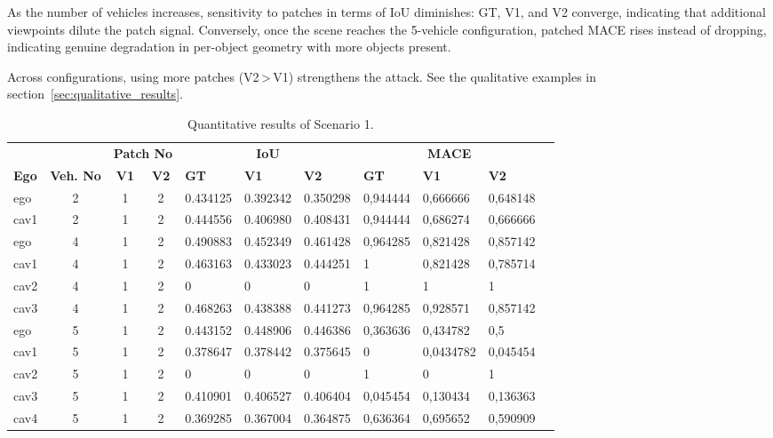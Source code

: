 As the number of vehicles increases, sensitivity to patches in terms of IoU diminishes: GT, V1, and V2 converge, indicating that additional viewpoints dilute the patch signal.
Conversely, once the scene reaches the 5-vehicle configuration, patched MACE rises instead of dropping, indicating genuine degradation in per-object geometry with more objects present.

Across configurations, using more patches (V2\,>\,V1) strengthens the attack.
See the qualitative examples in section~\ref{sec:qualitative_results}.

\begin{table}[h]
    \caption{Quantitative results of Scenario 1.}
    \label{tab:scenario1_results}
    \begin{tabularx}{\textwidth}{l c c c *{7}{X}}
        \toprule
            &             &   \multicolumn{2}{c}{\textbf{Patch No}}  & \multicolumn{3}{c}{\textbf{IoU}} & \multicolumn{3}{c}{\textbf{MACE}}                            \\
        \cmidrule(lr){5-7}\cmidrule(lr){8-10}
        \textbf{Ego}           &
        \textbf{Veh. No}       & \textbf{V1}      & \textbf{V2}      &
        \textbf{GT}            & \textbf{V1} & \textbf{V2} &
        \textbf{GT}            & \textbf{V1} & \textbf{V2}                                                                                                           \\
        \midrule %
        ego         & 2  & 1 & 2 & 0.434125 & 0.392342 & 0.350298 & 0,944444 & 0,666666 & 0,648148 \\
        cav1        & 2  & 1 & 2 & 0.444556 & 0.406980 & 0.408431 & 0,944444 & 0,686274 & 0,666666 \\
        \midrule
        ego         & 4  & 1 & 2 & 0.490883 & 0.452349  & 0.461428 & 0,964285 & 0,821428 & 0,857142 \\
        cav1        & 4  & 1 & 2 & 0.463163 & 0.433023  & 0.444251 & 1 & 0,821428 & 0,785714 \\
        cav2        & 4  & 1 & 2 & 0 & 0 & 0 & 1 & 1 & 1 \\
        cav3        & 4  & 1 & 2 & 0.468263 & 0.438388  & 0.441273 & 0,964285 & 0,928571 & 0,857142 \\
        \midrule
        ego         & 5  & 1 & 2 & 0.443152 & 0.448906  & 0.446386 & 0,363636 & 0,434782 & 0,5 \\
        cav1        & 5  & 1 & 2 & 0.378647 & 0.378442  & 0.375645 & 0 & 0,0434782 & 0,045454 \\
        cav2        & 5  & 1 & 2 & 0 & 0 & 0 & 1 & 0 & 1 \\
        cav3        & 5  & 1 & 2 & 0.410901 & 0.406527  & 0.406404 & 0,045454 & 0,130434 & 0,136363 \\
        cav4        & 5  & 1 & 2 & 0.369285 & 0.367004  & 0.364875 & 0,636364 & 0,695652 & 0,590909 \\
        \bottomrule
    \end{tabularx}
\end{table}

